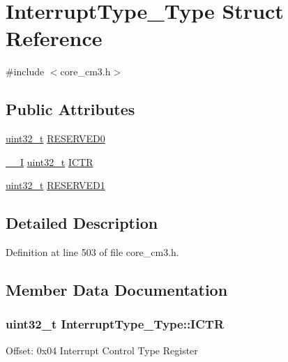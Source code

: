\hypertarget{struct_interrupt_type___type}{}\section{Interrupt\+Type\+\_\+\+Type Struct Reference}
\label{struct_interrupt_type___type}


{\ttfamily \#include $<$core\+\_\+cm3.\+h$>$}

\subsection*{Public Attributes}
\begin{DoxyCompactItemize}
\item 
\hyperlink{_p_e___types_8h_a33594304e786b158f3fb30289278f5af}{uint32\+\_\+t} \hyperlink{struct_interrupt_type___type_ae0d588643b0488fce4c0a90b85edf362}{R\+E\+S\+E\+R\+V\+E\+D0}
\item 
\hyperlink{group___c_m_s_i_s___c_m3__core__definitions_gaf63697ed9952cc71e1225efe205f6cd3}{\+\_\+\+\_\+I} \hyperlink{_p_e___types_8h_a33594304e786b158f3fb30289278f5af}{uint32\+\_\+t} \hyperlink{struct_interrupt_type___type_a2b10f6d37363a6b798ac97f4c4db1e63}{I\+C\+TR}
\item 
\hyperlink{_p_e___types_8h_a33594304e786b158f3fb30289278f5af}{uint32\+\_\+t} \hyperlink{struct_interrupt_type___type_a45933eb981309d50f943ec3af67f17be}{R\+E\+S\+E\+R\+V\+E\+D1}
\end{DoxyCompactItemize}


\subsection{Detailed Description}


Definition at line 503 of file core\+\_\+cm3.\+h.



\subsection{Member Data Documentation}
\subsubsection[{\texorpdfstring{I\+C\+TR}{ICTR}}]{ {\bf uint32\+\_\+t} Interrupt\+Type\+\_\+\+Type\+::\+I\+C\+TR}\hypertarget{struct_interrupt_type___type_a2b10f6d37363a6b798ac97f4c4db1e63}{}\label{struct_interrupt_type___type_a2b10f6d37363a6b798ac97f4c4db1e63}
Offset\+: 0x04 Interrupt Control Type Register 

